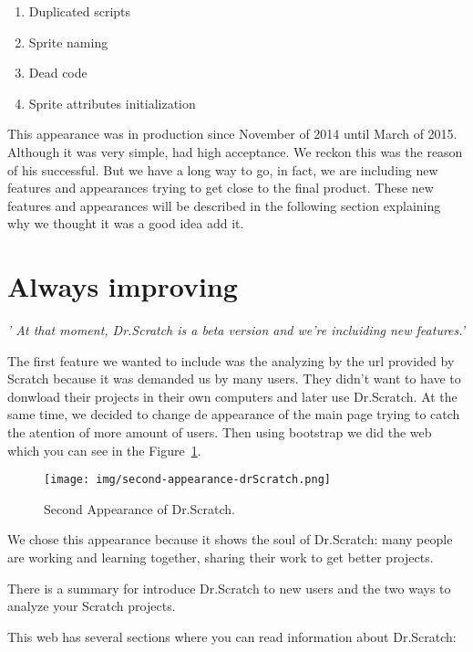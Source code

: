 \documentclass[a4paper, 12pt]{book}
\begin{document}
\begin{enumerate}
   	\item Duplicated scripts
   	\item Sprite naming
	\item Dead code
	\item Sprite attributes initialization
\end{enumerate}
This appearance was in production since November of 2014 until March of 
2015. Although it was very simple, had high acceptance. We reckon this was 
the reason of his successful. But we have a long way to go, in fact, we are
including new features and appearances trying to get close to the final product.
These new features and appearances will be described in the following section
explaining why we thought it was a good idea add it.

\section{Always improving}
\textsl{'
At that moment, Dr.Scratch is a beta version and we're incluiding new
features.'}

The first feature we wanted to include was the analyzing by the url provided
by Scratch because it was demanded us by many users. They didn't want to have to
donwload their projects in their own computers and later use Dr.Scratch. At the
same time, we decided to change de appearance of the main page trying to catch
the atention of more amount of users. Then using bootstrap we did the web which
you can see in the Figure~\ref{figure:second-appearance-drScratch}.


\begin{figure}
   	\centering
   	\texttt{[image: img/second-appearance-drScratch.png]}
   	\caption{Second Appearance of Dr.Scratch.}
   	\label{figure:second-appearance-drScratch}
\end{figure}

We chose this appearance because it shows the soul of Dr.Scratch: many people
are working and learning together, sharing their work to get better projects.

There is a summary for introduce Dr.Scratch to new users and the two ways to
analyze your Scratch projects.

This web has several sections where you can read information about Dr.Scratch:
\end{document}
